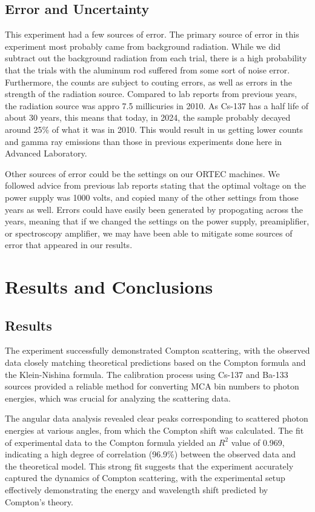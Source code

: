 \documentclass[10pt,letterpaper,onecolumn]{article}
\begin{document}
\subsection*{Error and Uncertainty}
This experiment had a few sources of error. The primary source of error in this experiment most probably came from background radiation. While we did subtract out the background radiation from each trial, there is a high probability that the trials with the aluminum rod suffered from some sort of noise error. Furthermore, the counts are subject to couting errors, as well as errors in the strength of the radiation source. Compared to lab reports from previous years, the radiation source was appro 7.5 millicuries in 2010. As Cs-137 has a half life of about 30 years, this means that today, in 2024, the sample probably decayed around 25\% of what it was in 2010. This would result in us getting lower counts and gamma ray emissions than those in previous experiments done here in Advanced Laboratory. 

Other sources of error could be the settings on our ORTEC machines. We followed advice from previous lab reports stating that the optimal voltage on the power supply was 1000 volts, and copied many of the other settings from those years as well. Errors could have easily been generated by propogating across the years, meaning that if we changed the settings on the power supply, preamiplifier, or spectroscopy amplifier, we may have been able to mitigate some sources of error that appeared in our results.

\section{Results and Conclusions}
\subsection*{Results}
The experiment successfully demonstrated Compton scattering, with the observed data closely matching theoretical predictions based on the Compton formula and the Klein-Nishina formula. The calibration process using Cs-137 and Ba-133 sources provided a reliable method for converting MCA bin numbers to photon energies, which was crucial for analyzing the scattering data.

The angular data analysis revealed clear peaks corresponding to scattered photon energies at various angles, from which the Compton shift was calculated. The fit of experimental data to the Compton formula yielded an \(R^2\) value of 0.969, indicating a high degree of correlation (96.9\%) between the observed data and the theoretical model. This strong fit suggests that the experiment accurately captured the dynamics of Compton scattering, with the experimental setup effectively demonstrating the energy and wavelength shift predicted by Compton's theory.
\end{document}
